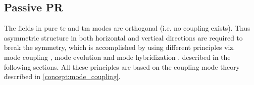 \documentclass[../report.tex]{subfiles}
\begin{document}
		\subsection{Passive PR}
The fields in pure \gls{te} and \gls{tm} modes are orthogonal (i.e. no coupling exists). Thus asymmetric structure in both horizontal and vertical directions are required to break the symmetry, which is accomplished by using different principles viz. mode coupling \cite{dai_novel_2011,ding_Integrated_2013,wang_design_2014}, mode evolution \cite{zhang_selected_2010,chen_compact_2011,zhang_efficient_2012,justin_conference_2012,kazuhiro_integrated_2015} and mode hybridization \cite{fukuda_integrated_2008,leung_numerical_2011,vermeulen_Silicon_2012,velasco_ultracompact_2012}, described in the following sections. All these principles are based on the coupling mode theory described in \ref{concept:mode_coupling}.
			
\end{document}
